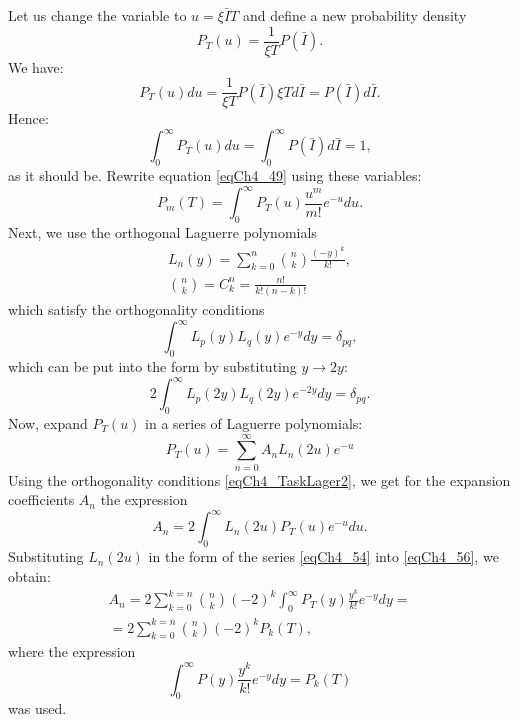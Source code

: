 Let us change the variable to $u = \xi \bar{I} T$ and define a new
probability density 
\[
P_T\left(u\right) = \frac{1}{\xi T} P\left(\bar{I}\right).
\]
We have: 
\[
P_T\left(u\right) du = \frac{1}{\xi T} P\left(\bar{I}\right) \xi T d
\bar{I} = P\left(\bar{I}\right) d \bar{I}.
\]
Hence: 
\[
\int_0^{\infty}P_T\left(u\right) du = 
\int_0^{\infty}P\left(\bar{I}\right) d\bar{I} = 1, 
\]
as it should be. Rewrite equation \eqref{eqCh4_49} using these variables:
\begin{equation}
P_m\left(T\right) = 
\int_0^{\infty}
P_T\left(u\right)
\frac{u^m}{m!} e^{-u} 
d u.
\label{eqCh4_53}
\end{equation}
Next, we use the orthogonal Laguerre polynomials
\begin{eqnarray}
L_n\left(y\right) = \sum_{k = 0}^{n}{n\choose k}
\frac{\left(-y\right)^k}{k!},
\nonumber \\
{n\choose k} = C_k^n = \frac{n!}{k!\left(n - k\right)!}
\label{eqCh4_54}
\end{eqnarray}
which satisfy the orthogonality conditions
\begin{equation}
\int_0^{\infty}L_p\left(y\right)L_q\left(y\right)e^{-y} dy =
\delta_{pq},
\label{eqCh4_TaskLager1}
\end{equation}
which can be put into the form by substituting $y \rightarrow 2y$:
\begin{equation}
2 \int_0^{\infty}L_p\left(2 y\right)L_q\left(2 y\right)e^{-2 y} dy =
\delta_{pq}.
\label{eqCh4_TaskLager2}
\end{equation}
Now, expand $P_T\left(u\right)$ in a series of Laguerre polynomials:
\begin{equation}
P_T\left(u\right) = 
\sum_{n = 0}^{\infty}
A_n L_n\left(2u \right)
e^{-u} 
\label{eqCh4_55}
\end{equation}
Using the orthogonality conditions \eqref{eqCh4_TaskLager2}, we get for
the expansion coefficients $A_n$ the expression  
\begin{equation}
A_n = 2 \int_0^{\infty}
L_n\left(2 u\right)P_T\left(u\right)e^{-u}du.
\label{eqCh4_56}
\end{equation}
Substituting $L_n\left(2 u\right)$ in the form of the series
\eqref{eqCh4_54} into \eqref{eqCh4_56}, we obtain: 
\begin{eqnarray}
A_n = 2 \sum_{k = 0}^{k = n}
{n\choose k}\left(- 2\right)^k\int_0^{\infty}
P_T\left(y\right)\frac{y^k}{k!}e^{-y} dy = 
\nonumber \\
= 2 \sum_{k = 0}^{k = n}
{n\choose k}
\left(- 2\right)^k
P_k\left(T\right),
\label{eqCh4_57}
\end{eqnarray}
where the expression
\[
\int_0^{\infty}P\left(y\right)\frac{y^k}{k!}e^{-y}dy =
P_k\left(T\right)
\]
was used. 

